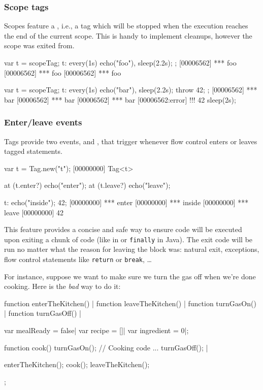 \subsubsection{Scope tags}
\label{sec:specs:tag:scope}

Scopes feature a , i.e., a tag which will be stopped when
the execution reaches the end of the current scope.  This is handy to
implement cleanups, however the scope was exited from.

\begin{urbiscript}[firstnumber=1]
{
  var t = scopeTag;
  t: every(1s)
      echo("foo"),
  sleep(2.2s);
};
[00006562] *** foo
[00006562] *** foo
[00006562] *** foo

{
  var t = scopeTag;
  t: every(1s)
      echo("bar"),
  sleep(2.2s);
  throw 42;
};
[00006562] *** bar
[00006562] *** bar
[00006562] *** bar
[00006562:error] !!! 42
sleep(2s);
\end{urbiscript}

\subsubsection{Enter/leave events}
\label{sec:specs:tag:enter-leave}

Tags provide two events,  and , that trigger
whenever flow control enters or leaves tagged statements.

\begin{urbiscript}[firstnumber=1]
var t = Tag.new("t");
[00000000] Tag<t>

at (t.enter?)
  echo("enter");
at (t.leave?)
  echo("leave");

t: {echo("inside"); 42};
[00000000] *** enter
[00000000] *** inside
[00000000] *** leave
[00000000] 42
\end{urbiscript}

This feature provides a concise and safe way to ensure code will be executed
upon exiting a chunk of code (like  in \Cxx or
\lstinline|finally| in Java). The exit code will be run no matter what the
reason for leaving the block was: natural exit, exceptions, flow control
statements like \lstinline|return| or \lstinline|break|, \ldots

For instance, suppose we want to make sure we turn the gas off when
we're done cooking. Here is the \emph{bad} way to do it:

\begin{urbicomment}
function enterTheKitchen() {}|
function leaveTheKitchen() {}|
function turnGasOn() {}|
function turnGasOff() {}|

var mealReady = false|
var recipe = []|
var ingredient = 0|;
\end{urbicomment}
\begin{urbiscript}
{
  function cook()
  {
    turnGasOn();
    // Cooking code ...
    turnGasOff();
  }|

  enterTheKitchen();
  cook();
  leaveTheKitchen();
};
\end{urbiscript}

